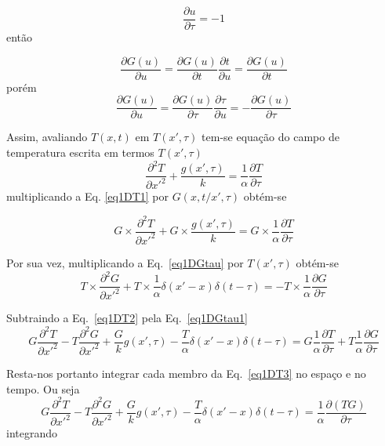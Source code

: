 \begin{equation}\label{rec4}
    \frac{ \partial u}{\partial \tau} = -1
\end{equation}
então
	
\begin{equation}\label{rec6}
    \frac{\partial G(u)}{\partial u} = 
    \frac{\partial G(u)}{\partial t} \frac{\partial t}{\partial u} = 
    \frac{\partial G(u)}{\partial t}
\end{equation}
porém   	
\begin{equation}\label{rec7}
    \frac{\partial G(u)}{\partial u} = 
    \frac{\partial G(u)}{\partial \tau} \frac{\partial \tau}{\partial u} =
    -\frac{ \partial G(u)}{\partial \tau} 
\end{equation}

Assim, avaliando $T(x,t)$ em $T(x',\tau)$ tem-se equação do campo de temperatura escrita em termos $T(x',\tau)$
\begin{equation}\label{eq1DT1}
    \frac{\partial^2 T}{\partial x'^2} + 
    \frac{g(x',\tau)}{k} 
    = \frac{1}{\alpha} \frac{\partial T}{\partial \tau}  
\end{equation}
multiplicando a Eq. \ref{eq1DT1} por $G(x,t/x',\tau)$ obtém-se
	
\begin{equation}\label{eq1DT2}
    G \times \frac{\partial^2 T}{\partial x'^2} + 
    G \times \frac{g(x',\tau)}{k} = 
    G \times \frac{1}{\alpha}\frac{\partial T}{\partial \tau}  
\end{equation}

Por sua vez, multiplicando a Eq.~\ref{eq1DGtau} por $T(x',\tau)$ obtém-se
\begin{equation}\label{eq1DGtau1}
    T \times \frac{\partial^2 G}{\partial x'^2} + 
    T \times \frac{1}{\alpha} \delta(x'-x)\delta(t-\tau) = 
  - T \times \frac{1}{\alpha} \frac{\partial G}{\partial \tau}  
\end{equation}

Subtraindo a Eq.~\ref{eq1DT2} pela  Eq.~\ref{eq1DGtau1}
\begin{equation}\label{eq1DT3}
    G \frac{\partial^2 T}{\partial x'^2} - 
    T \frac{\partial^2 G}{\partial x'^2} + 
    \frac{G}{k}g(x',\tau) - \frac{T}{\alpha}\delta(x'-x)\delta(t-\tau ) = 
    G \frac{1}{\alpha} \frac{\partial T}{\partial\tau} + 
    T \frac{1}{\alpha} \frac{\partial G}{\partial\tau}  
\end{equation}	

Resta-nos portanto integrar cada membro da Eq.~\ref{eq1DT3} no espaço e no tempo. Ou seja
\begin{equation}\label{eq1DT4}
    G \frac{\partial^2 T}{\partial x'^2} -
    T \frac{\partial^2 G}{\partial x'^2} + 
    \frac{G}{k}g(x',\tau) - \frac{T}{\alpha}\delta(x'-x)\delta(t-\tau) = 
    \frac{1}{\alpha} \frac{\partial(TG)}{\partial\tau} 
\end{equation}	
integrando 

